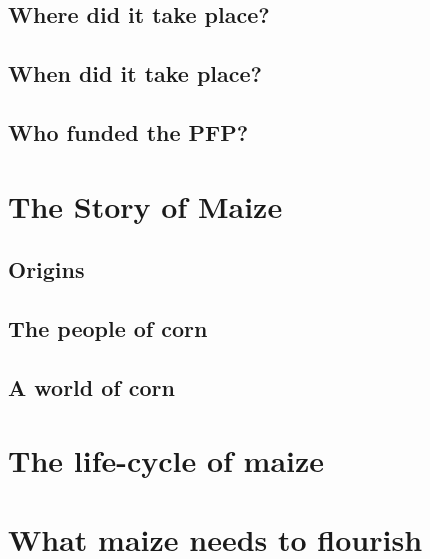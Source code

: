 \documentclass[12pt,]{krantz}
\begin{document}
\hypertarget{where-did-it-take-place}{%
\section{Where did it take place?}\label{where-did-it-take-place}}

\hypertarget{when-did-it-take-place}{%
\section{When did it take place?}\label{when-did-it-take-place}}

\hypertarget{who-funded-the-pfp}{%
\section{Who funded the PFP?}\label{who-funded-the-pfp}}

\hypertarget{the-story-of-maize}{%
\chapter{The Story of Maize}\label{the-story-of-maize}}

\hypertarget{origins}{%
\section{Origins}\label{origins}}

\hypertarget{the-people-of-corn}{%
\section{The people of corn}\label{the-people-of-corn}}

\hypertarget{a-world-of-corn}{%
\section{A world of corn}\label{a-world-of-corn}}

\hypertarget{the-life-cycle-of-maize}{%
\chapter{The life-cycle of maize}\label{the-life-cycle-of-maize}}

\hypertarget{what-maize-needs-to-flourish}{%
\chapter{What maize needs to
flourish}\label{what-maize-needs-to-flourish}}
\end{document}
